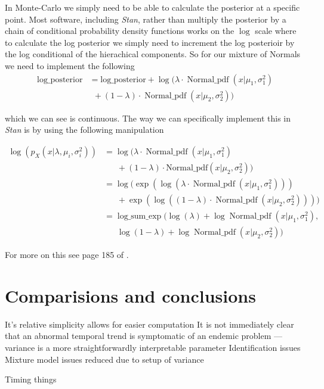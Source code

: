\documentclass[11pt]{report}
\begin{document}
In Monte-Carlo we simply need to be able to calculate the posterior at a specific point. Most software, including \emph{Stan}, rather than multiply the posterior by a chain of conditional probability density functions works on the $\log$ scale where to calculate the log posterior we simply need to increment the log posterioir by the log conditional of the hierachical components. So for our mixture of Normals we need to implement the following
\begin{align}
  \text{log\_posterior} &= \text{log\_posterior} + \log(\lambda \cdot \operatorname{Normal\_pdf}(x | \mu_1, \sigma_1^2)  \nonumber \\
                   & \ \ + (1 - \lambda) \cdot \operatorname{Normal\_pdf}(x | \mu_2, \sigma_2^2))
\end{align}

which we can see is continuous. The way we can specifically implement this in \emph{Stan} is by using the following manipulation

\begin{align}
\log(p_X(x | \lambda, \mu_i, \sigma^2_i)) &= \log(\lambda \cdot \operatorname{Normal\_pdf}(x | \mu_1, \sigma_1^2)  \nonumber \\
& \ \ \ \ \ \ \ + (1 - \lambda) \cdot \text{Normal\_pdf}(x | \mu_2, \sigma_2^2)) \\
&= \log(\exp(\log(\lambda \cdot \operatorname{Normal\_pdf}(x | \mu_1, \sigma_1^2)))  \nonumber \\
& \ \ \ \ \ \ \ + \exp(\log((1 - \lambda) \cdot \operatorname{Normal\_pdf}(x | \mu_2, \sigma_2^2)))) \\
&= \operatorname{log\_sum\_exp}(\log(\lambda) + \log\operatorname{Normal\_pdf}(x | \mu_1, \sigma_1^2),  \nonumber \\
& \ \ \ \ \ \ \ \log(1 - \lambda) + \log\operatorname{Normal\_pdf}(x | \mu_2, \sigma_2^2))
\end{align} 

For more on this see page 185 of \cite{stan}.

\chapter{Comparisions and conclusions}

It's relative simplicity allows for easier computation
It is not immediately clear that an abnormal temporal trend is symptomatic of an endemic problem --- variance is a more straightforwardly interpretable parameter
Identification issues
Mixture model issues reduced due to setup of variance

Timing things

\printbibliography
\end{document}
